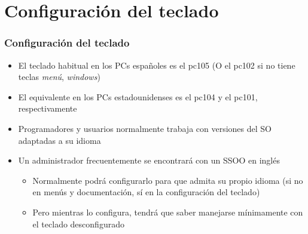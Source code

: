 \documentclass[ucs]{beamer}
\begin{document}
\section{Configuración del teclado}
\begin{frame}[fragile]
\frametitle{Configuración del teclado}
\begin{itemize}
\item
El teclado habitual en los PCs españoles es el pc105 (O el pc102 si no tiene teclas \emph{menú}, \emph{windows})
\item
El equivalente en los PCs estadounidenses es el pc104 y el pc101, respectivamente
\item
Programadores y usuarios normalmente trabaja con versiones del SO adaptadas a su idioma
\item
Un administrador frecuentemente se encontrará con un SSOO en inglés

\begin{itemize}
\item
Normalmente podrá configurarlo para que admita su propio idioma (si no en menús y documentación, sí en la 
configuración del teclado)
\item
Pero mientras lo configura, tendrá que saber manejarse mínimamente con el teclado desconfigurado
\end{itemize}
\end{itemize}

\end{frame}
\end{document}

